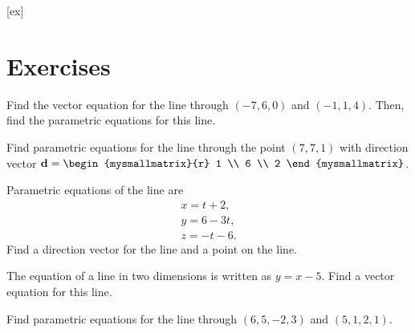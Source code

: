 [ex]
\section*{Exercises}

\begin{enumialphparenastyle}

\begin{ex} 
  Find the vector equation for the line through $(-7,6,0)$ and
  $(-1,1,4)$. Then, find the parametric equations for this
  line.
\end{ex}

\begin{ex}
  Find parametric equations for the line through the point
  $(7,7,1)$ with direction vector
  $\vect{d} = \begin{mysmallmatrix}{r} 1 \\ 6 \\ 2 \end{mysmallmatrix}$.
\end{ex} 

\begin{ex}
  Parametric equations of the line are 
  \begin{equation*}
    \begin{array}{c}
      x = t+2, \\
      y = 6-3t, \\
      z = -t-6.
    \end{array}
  \end{equation*}
  Find a direction vector for the line and a point on the line.
\end{ex} 

\begin{ex}
  The equation of a line in two dimensions is written as $y=x-5$. Find
  a vector equation for this line.
\end{ex} 

\begin{ex}
  Find parametric equations for the line through $(6, 5, -2, 3)$
  and $(5, 1, 2, 1)$.
\end{ex} 


\end{enumialphparenastyle}
